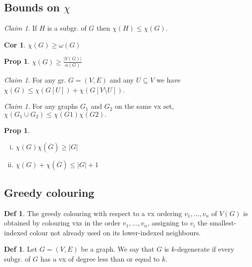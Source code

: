 \documentclass[11pt, fleqn, a4paper, landscape]{article}
\theoremstyle{plain} %
\newtheorem{pro}[thm]{Prop}
\newtheorem{cor}[thm]{Cor}
\theoremstyle{remark} %
\newtheorem{claim}[thm]{Claim}
\theoremstyle{definition} %
\newtheorem{defi}[thm]{Def}
\begin{document}
\begin{multicols}{5}
\addtocounter{subsection}{1}
\addtocounter{thm}{1}\addtocounter{thm}{1}
\subsection{Bounds on $\chi$}
\begin{claim}
If $H$ is a subgr. of $G$ then $\chi(H) \le \chi(G)$.
\end{claim}

\begin{cor}
$\chi(G) \ge \omega(G)$
\end{cor}
\addtocounter{thm}{1}
\begin{pro}
$\chi(G) \ge\frac{|V (G)|}{\alpha(G)}$
\end{pro}

\begin{claim}
For any gr. $G = (V,E)$ and any $U \subseteq V$ we have $\chi(G) \le \chi(G[U]) + \chi(G[V \setminus U])$.
\end{claim}

\begin{claim}
For any graphs $G_1$ and $G_2$ on the same vx set, $\chi(G_1 \cup G_2) \le \chi(G1)\chi(G2).$
\end{claim}


\begin{pro}
\begin{enumerate}[(i)]
\item $\chi(G)\chi(\overline{G})\ge |G|$
\item $\chi(G)+\chi(\overline{G})\le |G|+1$
\end{enumerate}
\end{pro}

\subsection{Greedy colouring}

\begin{defi}
The greedy colouring with respect to a vx ordering $v_1, \dots , v_n$ of $V (G)$ is obtained by colouring vxs in the order $v_1, \dots , v_n$, assigning to $v_i$ the smallest-indexed colour not already used on its lower-indexed neighbours.
\end{defi}
\addtocounter{thm}{1}
\begin{defi}
Let $G = (V,E)$ be a graph. We say that $G$ is $k$-degenerate if every subgr. of $G$ has a vx of degree less than or equal to $k$.
\end{defi}


\end{multicols}
\end{document}
